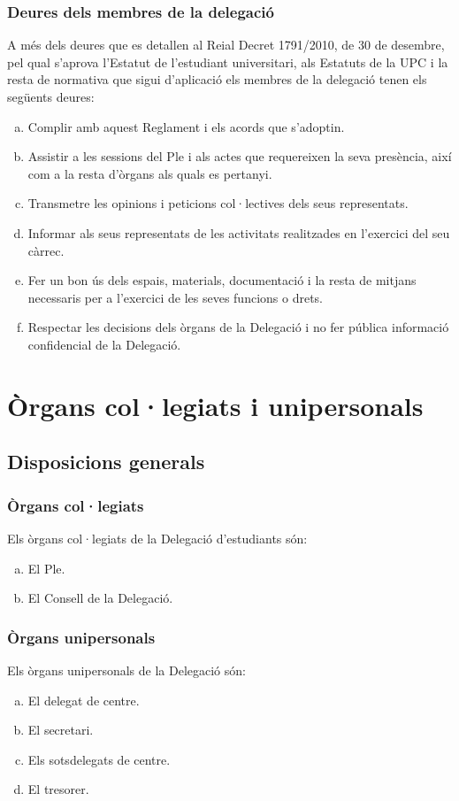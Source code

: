 \documentclass[a4paper,12pt]{article}
\begin{document}
\subsubsection{Deures dels membres de la delegació}
A més dels deures que es detallen al Reial Decret 1791/2010, de 30 de desembre, pel qual s'aprova l'Estatut de l'estudiant universitari, als Estatuts de la UPC i la resta de normativa que sigui d'aplicació els membres de la delegació tenen els següents deures:

\begin{enumerate}[a)]
	\item Complir amb aquest Reglament i els acords que s'adoptin.
	\item Assistir a les sessions del Ple i als actes que requereixen la seva presència, així com a la resta d'òrgans als quals es pertanyi.
	\item Transmetre les opinions i peticions col·lectives dels seus representats.
	\item Informar als seus representats de les activitats realitzades en l'exercici del seu càrrec.
	\item Fer un bon ús dels espais, materials, documentació i la resta de mitjans necessaris per a l'exercici de les seves funcions o drets.
	\item Respectar les decisions dels òrgans de la Delegació i no fer pública informació confidencial de la Delegació.
\end{enumerate}

\section{Òrgans col·legiats i unipersonals}
\subsection{Disposicions generals}
\subsubsection{Òrgans col·legiats}
Els òrgans col·legiats de la Delegació d'estudiants són:
\begin{enumerate}[a)]
	\item El Ple.
	\item El Consell de la Delegació.
\end{enumerate}

\subsubsection{Òrgans unipersonals}
Els òrgans unipersonals de la Delegació són:
\begin{enumerate}[a)]
	\item El delegat de centre.
	\item El secretari.
	\item Els sotsdelegats de centre.
	\item El tresorer.
\end{enumerate}
\end{document}
